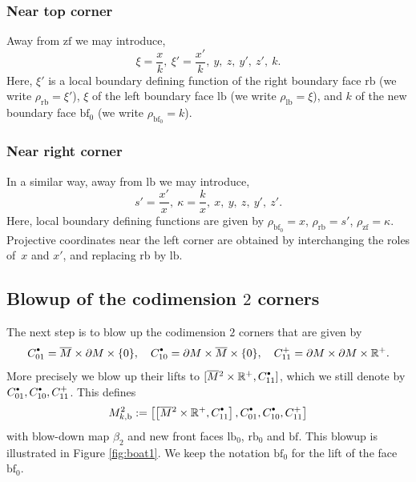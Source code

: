 \documentclass[JEP,XML,SOM,Unicode,NoFloatCountersInSection,published]{cedram}
\newcommand{\bbullet}{{\scriptscriptstyle\bullet}}
\newcommand{\sbullet}{{\raisebox{1pt}{$\bbullet$}}}
\theoremstyle{plain}
\theoremstyle{definition}
\newcommand{\R}{{\mathbb{R}}}
\newcommand{\lf}{{\mathrm{lb}}}
\newcommand{\rf}{{\mathrm{rb}}}
\newcommand{\bb}{{\mathrm{b}}}
\newcommand{\lfz}{{\mathrm{lb}_0}}
\newcommand{\rfz}{{\mathrm{rb}_0}}
\newcommand{\bbf}{{\mathrm{bf}}}
\newcommand{\bfz}{{\bbf_0}}
\newcommand{\zf}{{\mathrm{zf}}}
\newcommand{\Mbar}{{\overline{M}}}\let\M\Mbar
\begin{document}
\subsubsection*{Near top corner}
Away from $\zf$ we may introduce,
\begin{equation} \label{top corner}
\xi = \frac{x}{k}, \ \xi' = \frac{x'}{k}, \ y, \ z, \ y', \ z', \ k.
\end{equation}
Here, $\xi'$ is a local boundary defining function of the right boundary face $\rf$
(we write $\rho_{\rf} = \xi'$), $\xi$ of the
left boundary face $\lf$ (we write $\rho_{\lf} = \xi$), and $k$ of the new boundary face $\bfz$
(we write $\rho_{\bfz} = k$).

\subsubsection*{Near right corner}
In a similar way, away from $\lf$ we may introduce,
\begin{equation}\label{right corner}
s' = \frac{x'}{x}, \ \kappa = \frac{k}{x}, \ x, \ y, \ z, \ y', \ z'.
\end{equation}
Here, local boundary defining functions are given by
$ \rho_{\bfz} = x$, $\rho_{\rf} = s'$, $\rho_{\zf} = \kappa$.
Projective coordinates near the left corner are obtained by interchanging the
roles of~$x$ and $x'$, and replacing $\rf$ by $\lf$.

\subsection{Blowup of the codimension $2$ corners}
The next step is to blow up the codimension $2$ corners
that are given by
\begin{align*}
C_{01}^\sbullet = \Mbar \times \partial M \times \{0\}, \quad
C_{10}^\sbullet = \partial M \times \Mbar \times \{0\}, \quad
C_{11}^+ = \partial M \times \partial M \times \R^+.
\end{align*}
More precisely we blow up their lifts to $[\Mbar{}^2 \times \R^+, C_{11}^\sbullet]$,
which we still denote by $C_{01}^\sbullet, C_{10}^\sbullet, C_{11}^+$.
This defines
\begin{equation}\label{M2kb}
M^{2}_{k,\bb} := \left[ \left[\Mbar{}^2 \times \R^+, C_{11}^\sbullet\right], C_{01}^\sbullet, C_{10}^\sbullet, C_{11}^+\right]
\end{equation}
with blow-down map $\beta_2$ and new front faces $\lfz$, $\rfz$ and $\bbf$.
This blowup is illustrated in Figure \ref{fig:boat1}.
We keep the notation $\bbf_0$ for the lift of the face $\bbf_0$.
\end{document}
